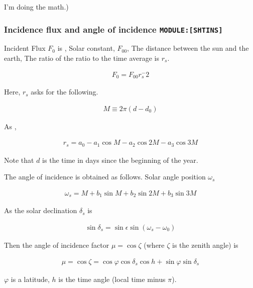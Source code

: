 I'm doing the math.)

\hypertarget{incidence-flux-and-angle-of-incidence-moduleshtins}{%
\subsubsection{\texorpdfstring{Incidence flux and angle of incidence
\texttt{MODULE:{[}SHTINS{]}}}{Incidence flux and angle of incidence MODULE:{[}SHTINS{]}}}\label{incidence-flux-and-angle-of-incidence-moduleshtins}}

Incident Flux \(F_0\) is , Solar constant, \(F_{00}\), The distance
between the sun and the earth, The ratio of the ratio to the time
average is \(r_s\).

\begin{eqnarray}
F_0 = F_00 r_s^-2 
\end{eqnarray}

Here, \(r_s\) asks for the following.

\begin{eqnarray}
  M \equiv 2 \pi ( d - d_0 ) 
\end{eqnarray}

As ,

\begin{eqnarray}
  r_s = a_0 - a_1 \cos M - a_2 \cos 2M - a_3 \cos 3M
\end{eqnarray}

Note that \(d\) is the time in days since the beginning of the year.

The angle of incidence is obtained as follows. Solar angle position
\(\omega_s\)

\begin{eqnarray}
  \omega_s = M + b_1 \sin M + b_2 \sin 2M + b_3 \sin 3M
\end{eqnarray}

As the solar declination \(\delta_s\) is

\begin{eqnarray}
  \sin \delta_s = \sin \epsilon \sin ( \omega_s - \omega_0 ) 
\end{eqnarray}

Then the angle of incidence factor \(\mu = \cos \zeta\) (where \(\zeta\)
is the zenith angle) is

\begin{eqnarray}
\mu = \cos \zeta = \cos \varphi \cos \delta_s \cos h
                 + \sin \varphi \sin \delta_s
\end{eqnarray}

\(\varphi\) is a latitude, \(h\) is the time angle (local time minus
\(\pi\)).

